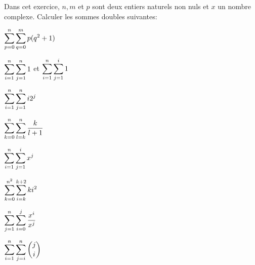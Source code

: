 \documentclass[a4paper, 11pt,reqno]{article}
\begin{document}
\begin{exercice}  \; 
Dans cet exercice, $n, m$ et $p$ sont deux entiers naturels non nuls et $x$ un nombre complexe. Calculer les sommes doubles suivantes:
\begin{enumerate}
\begin{minipage}[t]{0.3\textwidth}
\item $\displaystyle \sum\limits_{p=0}^{n} \displaystyle \sum\limits_{q=0}^{m} p(q^2+1)$
\item $\displaystyle \sum\limits_{i=1}^n\displaystyle \sum\limits_{j=1}^n 1$ \; et \; $\displaystyle \sum\limits_{i=1}^n\displaystyle \sum\limits_{j=1}^i 1$
\item $\displaystyle \sum\limits_{i=1}^n\displaystyle \sum\limits_{j=1}^n i2^j$
\end{minipage}
\begin{minipage}[t]{0.3\textwidth}
\item $\displaystyle \sum\limits_{k=0}^n\displaystyle \sum\limits_{l=k}^n \displaystyle\frac{k}{l+1}$
\item  $\displaystyle \sum\limits_{i=1}^n\displaystyle \sum\limits_{j=1}^i x^j$
\item  $\displaystyle \sum\limits_{k=0}^{n^2}\displaystyle \sum\limits_{i=k}^{k+2} ki^2$
\end{minipage}
\begin{minipage}[t]{0.3\textwidth}
\item  $\displaystyle \sum\limits_{j=1}^n\displaystyle \sum\limits_{i=0}^j \displaystyle\frac{ x^{i} }{  x^j }$
\item  $\displaystyle \sum\limits_{i=1}^n\displaystyle \sum\limits_{j=i}^n \binom{j}{i}$
\end{minipage}
 \end{enumerate}
\end{exercice}
\end{document}
